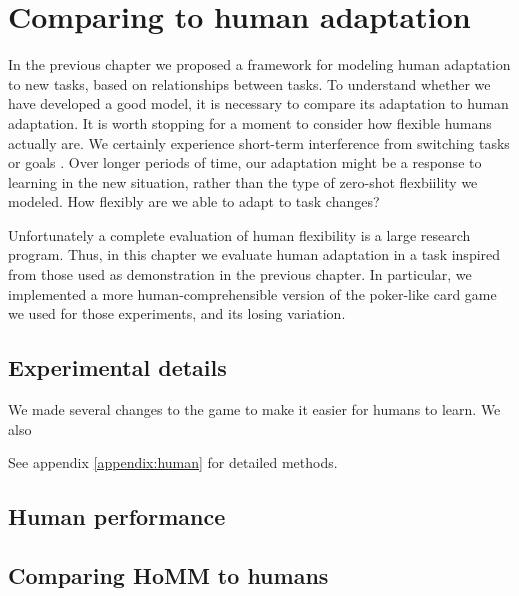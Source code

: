 \chapter{Comparing to human adaptation} \label{chapter:human}

In the previous chapter we proposed a framework for modeling human adaptation to new tasks, based on relationships between tasks. To understand whether we have developed a good model, it is necessary to compare its adaptation to human adaptation. It is worth stopping for a moment to consider how flexible humans actually are. We certainly experience short-term interference from switching tasks or goals \citep{Rogers1995}. Over longer periods of time, our adaptation might be a response to learning in the new situation, rather than the type of zero-shot flexbiility we modeled. How flexibly are we able to adapt to task changes? \par
Unfortunately a complete evaluation of human flexibility is a large research program. Thus, in this chapter we evaluate human adaptation in a task inspired from those used as demonstration in the previous chapter. In particular, we implemented a more human-comprehensible version of the poker-like card game we used for those experiments, and its losing variation. \par

\section{Experimental details}
We made several changes to the game to make it easier for humans to learn. We also 

See appendix \ref{appendix:human} for detailed methods.


\section{Human performance}

\section{Comparing HoMM to humans}

